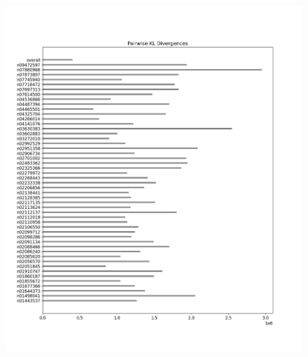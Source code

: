 \documentclass{article}
\begin{document}
\begin{figure}[H]
\begin{minipage}{0.45\textwidth}
        \end{minipage}\hfill
        \begin{minipage}{0.45\textwidth}
            \centering
            \includegraphics[width=\textwidth]{cross_imagenet_imgr_r_second_last/alexnet_kl_div_a_to_bpairwise.png} %
        \end{minipage}
        \begin{minipage}{0.45\textwidth}
            \centering

\end{minipage}
\end{figure}
\end{document}
